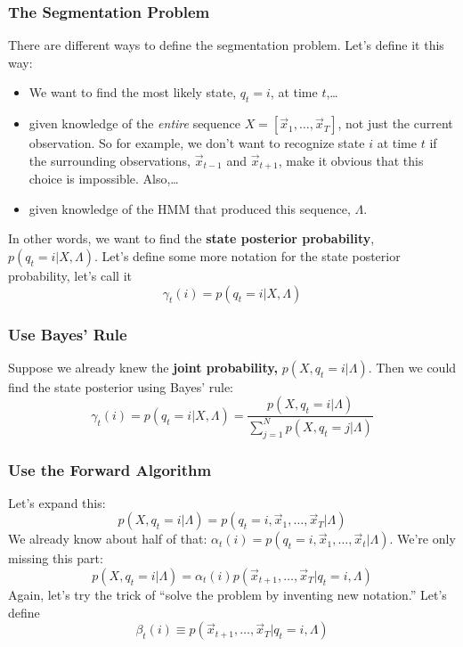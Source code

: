 \documentclass{beamer}
\begin{document}
\begin{frame}
  \frametitle{The Segmentation Problem}

  There are different ways to define the segmentation problem.  Let's
  define it this way:
  \begin{itemize}
  \item We want to find the most likely state, $q_t=i$, at time $t$,\ldots
  \item given knowledge of the {\em entire} sequence
    $X=[\vec{x}_1,\ldots,\vec{x}_T]$, not just the current observation.
    So for example, we don't want to recognize state $i$ at time $t$ if
    the surrounding observations, $\vec{x}_{t-1}$ and $\vec{x}_{t+1}$, make it obvious that
    this choice is impossible.  Also,\ldots
  \item given knowledge of the HMM that produced this sequence, $\Lambda$.
  \end{itemize}

  In other words, we want to find the {\bf state posterior
    probability}, $p(q_t=i|X,\Lambda)$.  Let's define some more
  notation for the state posterior probability, let's call it
  \[
  \gamma_t(i) = p(q_t=i|X,\Lambda)
  \]
\end{frame}

\begin{frame}
  \frametitle{Use Bayes' Rule}

  Suppose we already knew the {\bf joint probability,}
  $p(X,q_t=i|\Lambda)$.  Then we could find the state posterior using
  Bayes' rule:
  \begin{displaymath}
    \gamma_t(i) = p(q_t=i|X,\Lambda) = \frac{p(X,q_t=i|\Lambda)}{\sum_{j=1}^N p(X,q_t=j|\Lambda)}
  \end{displaymath}
\end{frame}

\begin{frame}
  \frametitle{Use the Forward Algorithm}

  Let's expand this:
  \[
  p(X,q_t=i|\Lambda) = p(q_t=i,\vec{x}_1,\ldots,\vec{x}_T|\Lambda)
  \]
  We already know about half of that: $\alpha_t(i)=p(q_t=i,\vec{x}_1,\ldots,\vec{x}_t|\Lambda)$.
  We're only missing this part:
  \[
  p(X,q_t=i|\Lambda) = \alpha_t(i)p(\vec{x}_{t+1},\ldots,\vec{x}_T|q_t=i,\Lambda)
  \]
  Again, let's try the trick of ``solve the problem by inventing new notation.''  Let's define
  \[
  \beta_t(i) \equiv p(\vec{x}_{t+1},\ldots,\vec{x}_T|q_t=i,\Lambda)
  \]
\end{frame}
\end{document}
